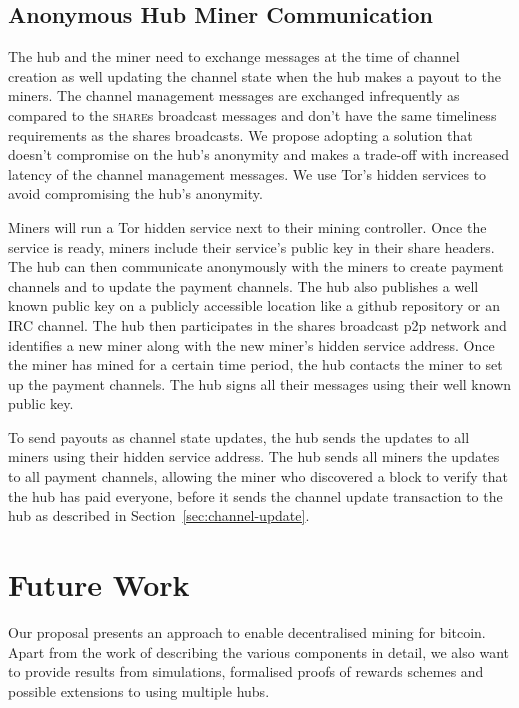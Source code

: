 \documentclass{article}
\begin{document}
\subsection{Anonymous Hub Miner
  Communication}\label{sec:hub-miner-communication}

The hub and the miner need to exchange messages at the time of channel
creation as well updating the channel state when the hub makes a
payout to the miners. The channel management messages are exchanged
infrequently as compared to the \textsc{share}s broadcast messages and
don't have the same timeliness requirements as the shares
broadcasts. We propose adopting a solution that doesn't compromise on
the hub's anonymity and makes a trade-off with increased latency of
the channel management messages. We use Tor's hidden services to avoid
compromising the hub's anonymity.

Miners will run a Tor hidden service next to their mining
controller. Once the service is ready, miners include their service's
public key in their share headers. The hub can then communicate
anonymously with the miners to create payment channels and to update
the payment channels. The hub also publishes a well known public key
on a publicly accessible location like a github repository or an IRC
channel. The hub then participates in the shares broadcast p2p network
and identifies a new miner along with the new miner's hidden service
address. Once the miner has mined for a certain time period, the hub
contacts the miner to set up the payment channels. The hub signs all
their messages using their well known public key.

To send payouts as channel state updates, the hub sends the updates to
all miners using their hidden service address. The hub sends all
miners the updates to all payment channels, allowing the miner who
discovered a block to verify that the hub has paid everyone, before it
sends the channel update transaction to the hub as described in
Section~\ref{sec:channel-update}.

\section{Future Work}

Our proposal presents an approach to enable decentralised mining for
bitcoin. Apart from the work of describing the various components in
detail, we also want to provide results from simulations, formalised
proofs of rewards schemes and possible extensions to using multiple
hubs.
\end{document}
